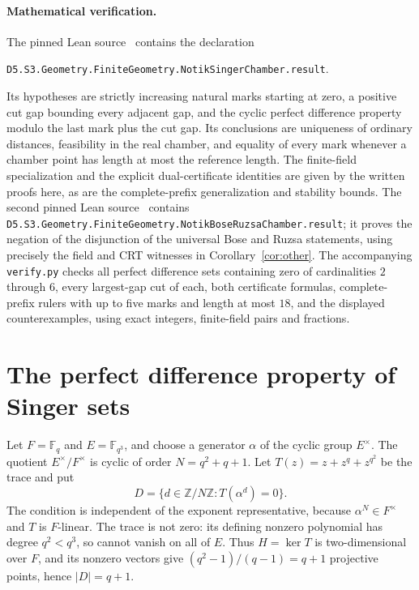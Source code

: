 \documentclass[11pt,a4paper]{article}
\newcommand{\Z}{\mathbb Z}
\begin{document}
\paragraph{Mathematical verification.}
The pinned Lean source~\cite{lean} contains the declaration
\begin{center}\small
\texttt{D5.S3.Geometry.FiniteGeometry.NotikSingerChamber.result}.
\end{center}
Its hypotheses are strictly increasing natural marks starting at zero,
a positive cut gap bounding every adjacent gap, and the cyclic perfect
difference property modulo the last mark plus the cut gap.
Its conclusions are uniqueness of ordinary distances, feasibility in the
real chamber, and equality of every mark whenever a chamber point has
length at most the reference length.
The finite-field specialization and the explicit dual-certificate identities
are given by the written proofs here, as are the complete-prefix
generalization and stability bounds. The second pinned Lean
source~\cite{leanother} contains
\texttt{D5.S3.Geometry.FiniteGeometry.\allowbreak{}NotikBoseRuzsaChamber.result};
it proves the negation of the disjunction of the universal Bose and
Ruzsa statements, using precisely the field and CRT witnesses in
Corollary~\ref{cor:other}.
The accompanying \texttt{verify.py} checks all perfect difference sets
containing zero of cardinalities $2$ through $6$, every largest-gap cut
of each, both certificate formulas, complete-prefix rulers with up to
five marks and length at most $18$, and the displayed counterexamples,
using exact integers, finite-field pairs and fractions.

\appendix
\section{The perfect difference property of Singer sets}

Let $F=\mathbb F_q$ and $E=\mathbb F_{q^3}$, and choose a generator
$\alpha$ of the cyclic group $E^\times$.
The quotient $E^\times/F^\times$ is cyclic of order
$N=q^2+q+1$. Let $T(z)=z+z^q+z^{q^2}$ be the trace and put
\[
 D=\{d\in\Z/N\Z:T(\alpha^d)=0\}.
\]
The condition is independent of the exponent representative, because
$\alpha^N\in F^\times$ and $T$ is $F$-linear.
The trace is not zero: its defining nonzero polynomial has degree
$q^2<q^3$, so cannot vanish on all of $E$.
Thus $H=\ker T$ is two-dimensional over $F$, and its nonzero vectors
give $(q^2-1)/(q-1)=q+1$ projective points, hence $|D|=q+1$.
\end{document}
